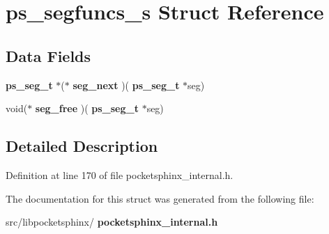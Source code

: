 \section{ps\+\_\+segfuncs\+\_\+s Struct Reference}
\label{structps__segfuncs__s}
\subsection*{Data Fields}
\begin{DoxyCompactItemize}
\item 
\mbox{\label{structps__segfuncs__s_a880757cdcfb8c858dfa82d44259fc8f9}} 
\textbf{ ps\+\_\+seg\+\_\+t} $\ast$($\ast$ {\bfseries seg\+\_\+next} )(\textbf{ ps\+\_\+seg\+\_\+t} $\ast$seg)
\item 
\mbox{\label{structps__segfuncs__s_aefbd109d77bf6556b352e5fab721858e}} 
void($\ast$ {\bfseries seg\+\_\+free} )(\textbf{ ps\+\_\+seg\+\_\+t} $\ast$seg)
\end{DoxyCompactItemize}


\subsection{Detailed Description}


Definition at line 170 of file pocketsphinx\+\_\+internal.\+h.



The documentation for this struct was generated from the following file\+:\begin{DoxyCompactItemize}
\item 
src/libpocketsphinx/\textbf{ pocketsphinx\+\_\+internal.\+h}\end{DoxyCompactItemize}
